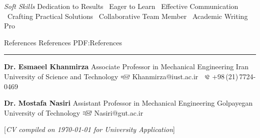 \documentclass[letterpaper,MMMyyyy]{ResumeTemplate}
\newcommand{\CVNote}{CV compiled on {\today} for University Application}
\begin{document}
\begin{Body}
\vspace{5pt}
\BulletItem
\textit{Soft Skills}
\newline
Dedication to Results 
\textbullet\ Eager to Learn 
\textbullet\ Effective Communication 
\textbullet\ Crafting Practical Solutions 
\textbullet\ Collaborative Team Member
\textbullet\ Academic Writing Pro

%
%



\Section
{References}
{References}
{PDF:References}
\textcolor{Forestg}{\vspace{0.05cm}\hrule height 0.1cm}\BigGap
\BulletItem
\textbf{Dr. Esmaeel Khanmirza}
\newline
Associate Professor in Mechanical Engineering
\newline
Iran University of Science and Technology
\newline
\includegraphics[height=7pt]{icons/SendEmail.png} Khanmirza@iust.ac.ir
\,\SubBulletSymbol\,
\includegraphics[height=7pt]{icons/phone1.png} +98\,(21)\,7724-0469

\BigGap
\BulletItem
\textbf{Dr. Mostafa Nasiri}
\newline
Assistant Professor in Mechanical Engineering
\newline
Golpayegan University of Technology
\newline
\includegraphics[height=7pt]{icons/SendEmail.png} Nasiri@gut.ac.ir

\end{Body}


\UseNoteFont%
\hfill%
[\textit{\CVNote}]
\end{document}
